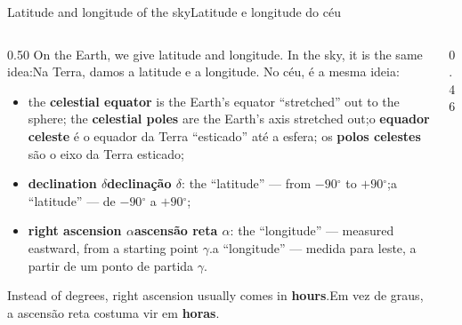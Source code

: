 \documentclass[aspectratio=169,11pt]{beamer}
\newcommand{\tr}[2]{\ifEN#2\else#1\fi}
\newcommand{\bnum}[1]{\textbf{\textcolor{mTeal}{#1}}}
\newcommand{\gr}{\ensuremath{{}^{\circ}}}
\newcommand{\esferaContorno}{\draw[mStoneMid!70, thick, fill=corCeu!5] (0,0) circle (1);}
\newcommand{\esferaEquador}{%
  \draw[corCeu!70, dashed] plot[smooth] coordinates {(0.996,-0.033) (1.000,0.000) (0.996,0.033) (0.985,0.065) (0.966,0.097) (0.940,0.128) (0.906,0.158) (0.866,0.187) (0.819,0.215) (0.766,0.241) (0.707,0.265) (0.643,0.287) (0.574,0.307) (0.500,0.324) (0.423,0.340) (0.342,0.352) (0.259,0.362) (0.174,0.369) (0.087,0.373) (0.000,0.375) (-0.087,0.373) (-0.174,0.369) (-0.259,0.362) (-0.342,0.352) (-0.423,0.340) (-0.500,0.324) (-0.574,0.307) (-0.643,0.287) (-0.707,0.265) (-0.766,0.241) (-0.819,0.215) (-0.866,0.187) (-0.906,0.158) (-0.940,0.128) (-0.966,0.097) (-0.985,0.065) (-0.996,0.033) (-1.000,0.000)};
  \draw[corCeu, very thick] plot[smooth] coordinates {(-0.643,-0.287) (-0.574,-0.307) (-0.500,-0.324) (-0.423,-0.340) (-0.342,-0.352) (-0.259,-0.362) (-0.174,-0.369) (-0.087,-0.373) (0.000,-0.375) (0.087,-0.373) (0.174,-0.369) (0.259,-0.362) (0.342,-0.352) (0.423,-0.340) (0.500,-0.324) (0.574,-0.307) (0.643,-0.287) (0.707,-0.265) (0.766,-0.241) (0.819,-0.215) (0.866,-0.187) (0.906,-0.158) (0.940,-0.128) (0.966,-0.097) (0.985,-0.065) (0.996,-0.033)};
  \draw[corCeu, very thick] plot[smooth] coordinates {(-1.000,0.000) (-0.996,-0.033) (-0.985,-0.065) (-0.966,-0.097) (-0.940,-0.128) (-0.906,-0.158) (-0.866,-0.187) (-0.819,-0.215) (-0.766,-0.241) (-0.707,-0.265) (-0.643,-0.287)};
}
\newcommand{\esferaEixo}{\draw[corSist, dashed] (0,0) -- (0.000,-0.927); \draw[corSist, very thick] (0,0) -- (0.000,0.927) -- (0.000,1.094);}
\newcommand{\esferaArcoAR}[1]{\draw[#1] plot[smooth] coordinates {(-0.643,-0.287) (-0.574,-0.307) (-0.500,-0.324) (-0.423,-0.340) (-0.342,-0.352) (-0.259,-0.362) (-0.174,-0.369) (-0.087,-0.373) (0.000,-0.375) (0.087,-0.373) (0.174,-0.369) (0.259,-0.362) (0.342,-0.352) (0.423,-0.340) (0.500,-0.324) (0.574,-0.307)};}
\newcommand{\esferaArcoDec}[1]{\draw[#1] plot[smooth] coordinates {(0.574,-0.307) (0.573,-0.258) (0.570,-0.208) (0.567,-0.158) (0.561,-0.107) (0.554,-0.056) (0.546,-0.005) (0.535,0.046) (0.524,0.097) (0.511,0.148) (0.497,0.198)};}
\newcommand{\esferaMeridiano}[1]{\draw[#1] plot[smooth] coordinates {(0.497,0.198) (0.464,0.297) (0.426,0.392) (0.384,0.484) (0.337,0.570) (0.287,0.650) (0.233,0.722) (0.177,0.787) (0.119,0.843) (0.060,0.890) (0.000,0.927)};}
\newcommand{\ptGama}{(-0.643,-0.287)}
\newcommand{\ptEstrela}{(0.497,0.198)}
\begin{document}
\begin{frame}{\tr{Latitude e longitude do céu}{Latitude and longitude of the sky}}
  \begin{columns}[T]
    \begin{column}{0.50\textwidth}
      \small
      \tr{Na Terra, damos a latitude e a longitude. No céu, é a mesma ideia:}{On the Earth, we
      give latitude and longitude. In the sky, it is the same idea:}
      \smallskip
      \begin{itemize}
        \setlength{\itemsep}{2pt}
        \item \tr{o \bnum{equador celeste} é o equador da Terra ``esticado'' até a esfera; os
              \bnum{polos celestes} são o eixo da Terra esticado;}{the \bnum{celestial equator}
              is the Earth's equator ``stretched'' out to the sphere; the \bnum{celestial
              poles} are the Earth's axis stretched out;}
        \item \textcolor{corErro}{\textbf{\tr{declinação $\delta$}{declination $\delta$}}}:
              \tr{a ``latitude'' --- de $-90\gr$ a $+90\gr$;}{the ``latitude'' --- from
              $-90\gr$ to $+90\gr$;}
        \item \textcolor{corTempo}{\textbf{\tr{ascensão reta $\alpha$}{right ascension
              $\alpha$}}}: \tr{a ``longitude'' --- medida para leste, a partir de um ponto
              de partida $\gamma$.}{the ``longitude'' --- measured eastward, from a starting
              point $\gamma$.}
      \end{itemize}
      \smallskip
      \tr{Em vez de graus, a ascensão reta costuma vir em \bnum{horas}.}{Instead of degrees,
      right ascension usually comes in \bnum{hours}.}
    \end{column}
    \begin{column}{0.46\textwidth}
      \centering
    \end{column}
  \end{columns}
\end{frame}
\end{document}
